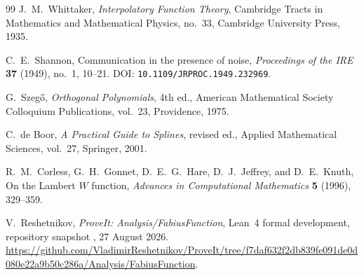 \documentclass[11pt,oneside]{article}
\theoremstyle{definition}
\theoremstyle{remark}
\newcommand{\1}{\mathbf 1}
\begin{document}
\begin{thebibliography}{99}
J.~M.~Whittaker,
\newblock \emph{Interpolatory Function Theory},
\newblock Cambridge Tracts in Mathematics and Mathematical Physics, no.~33,
  Cambridge University Press, 1935.

C.~E.~Shannon,
\newblock Communication in the presence of noise,
\newblock \emph{Proceedings of the IRE} \textbf{37} (1949), no.~1, 10--21.
\newblock DOI: \nolinkurl{10.1109/JRPROC.1949.232969}.

G.~Szegő,
\newblock \emph{Orthogonal Polynomials}, 4th ed.,
\newblock American Mathematical Society Colloquium Publications, vol.~23,
  Providence, 1975.

C.~de Boor,
\newblock \emph{A Practical Guide to Splines}, revised ed.,
\newblock Applied Mathematical Sciences, vol.~27, Springer, 2001.

R.~M.~Corless, G.~H.~Gonnet, D.~E.~G.~Hare, D.~J.~Jeffrey, and D.~E.~Knuth,
\newblock On the Lambert $W$ function,
\newblock \emph{Advances in Computational Mathematics}
  \textbf{5} (1996), 329--359.

V.~Reshetnikov,
\newblock \emph{ProveIt: Analysis/FabiusFunction},
\newblock Lean~4 formal development, repository snapshot
, 27 August 2026.
\newblock \url{https://github.com/VladimirReshetnikov/ProveIt/tree/f7daf632f2db839fe091de0d080e22a9b50c286a/Analysis/FabiusFunction}.

\end{thebibliography}
\end{document}

